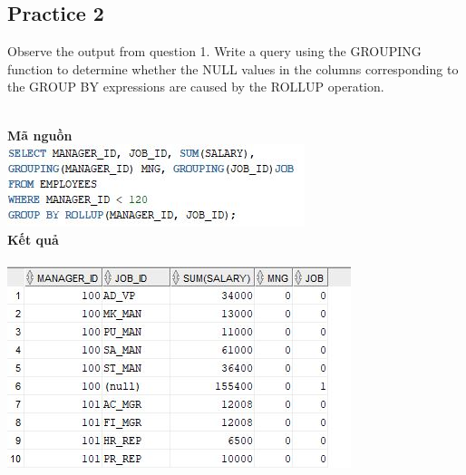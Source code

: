 \documentclass[12pt,a4paper]{report}
\begin{document}
\subsection{Practice 2}
\begin{boxedminipage}[t]{15.5cm}
Observe the output from question 1. Write a query using the GROUPING function to determine whether the NULL values in the columns corresponding to the GROUP BY expressions are caused by the ROLLUP operation.

\end{boxedminipage}
\newline
\\
\textbf{Mã nguồn}
\\
\newline
\includegraphics[scale=1]{28.jpg}\\
\textbf{Kết quả}\\\\
\includegraphics[scale=1]{k28.jpg}
\end{document}

